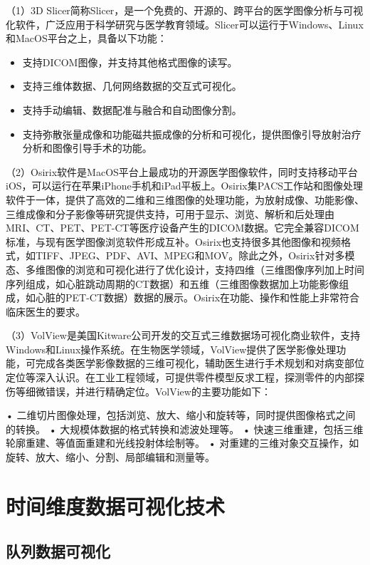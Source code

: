 \documentclass[lang=cn,color=black,10pt,founder,newtx]{elegantbook}
\begin{document}
（1）3D Slicer简称Slicer，是一个免费的、开源的、跨平台的医学图像分析与可视化软件，广泛应用于科学研究与医学教育领域。Slicer可以运行于Windows、Linux和MacOS平台之上，具备以下功能：
\begin{itemize}
\item 支持DICOM图像，并支持其他格式图像的读写。
\item 支持三维体数据、几何网络数据的交互式可视化。
\item 支持手动编辑、数据配准与融合和自动图像分割。
\item 支持弥散张量成像和功能磁共振成像的分析和可视化，提供图像引导放射治疗分析和图像引导手术的功能。
\end{itemize}


（2）Osirix软件是MacOS平台上最成功的开源医学图像软件，同时支持移动平台iOS，可以运行在苹果iPhone手机和iPad平板上。Osirix集PACS工作站和图像处理软件于一体，提供了高效的二维和三维图像的处理功能，为放射成像、功能影像、三维成像和分子影像等研究提供支持，可用于显示、浏览、解析和后处理由MRI、CT、PET、PET-CT等医疗设备产生的DICOM数据。它完全兼容DICOM标准，与现有医学图像浏览软件形成互补。Osirix也支持很多其他图像和视频格式，如TIFF、JPEG、PDF、AVI、MPEG和MOV。除此之外，Osirix针对多模态、多维图像的浏览和可视化进行了优化设计，支持四维（三维图像序列加上时间序列组成，如心脏跳动周期的CT数据）和五维（三维图像数据加上功能影像组成，如心脏的PET-CT数据）数据的展示。Osirix在功能、操作和性能上非常符合临床医生的要求。

（3）VolView是美国Kitware公司开发的交互式三维数据场可视化商业软件，支持Windows和Linux操作系统。在生物医学领域，VolView提供了医学影像处理功能，可完成各类医学影像数据的三维可视化，辅助医生进行手术规划和对病变部位定位等深入认识。在工业工程领域，可提供零件模型反求工程，探测零件的内部探伤等细微错误，并进行精确定位。VolView的主要功能如下：

•	二维切片图像处理，包括浏览、放大、缩小和旋转等，同时提供图像格式之间的转换。
•	大规模体数据的格式转换和滤波处理等。
•	快速三维重建，包括三维轮廓重建、等值面重建和光线投射体绘制等。
•	对重建的三维对象交互操作，如旋转、放大、缩小、分割、局部编辑和测量等。


\section{时间维度数据可视化技术}

\subsection{队列数据可视化}
\end{document}
